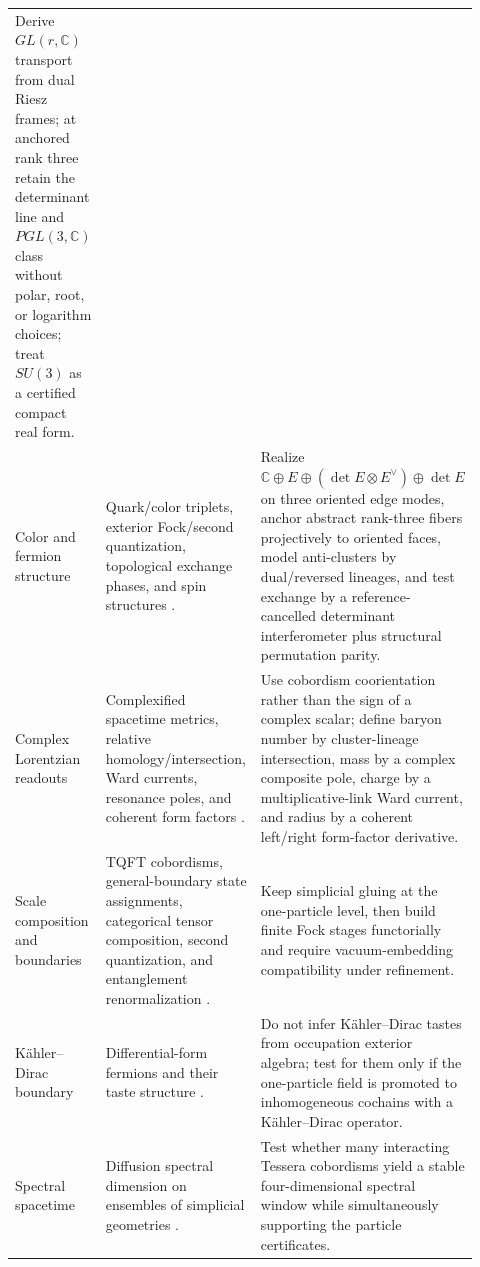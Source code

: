 \documentclass[11pt,letterpaper]{article}
\begin{document}
\begin{longtable}{p{0.2\linewidth}p{0.36\linewidth}p{0.36\linewidth}}
Derive $GL(r,\mathbb C)$ transport from dual Riesz frames; at anchored rank
three retain the determinant line and $PGL(3,\mathbb C)$ class without polar,
root, or logarithm choices; treat $SU(3)$ as a certified compact real form.\\
\addlinespace
Color and fermion structure &
Quark/color triplets, exterior Fock/second quantization, topological exchange
phases, and spin structures
\cite{gellmann1964,hannambu1965,greenberg1964,berezin1966,%
laidlawdewitt1971,leinaasmyrheim1977,lawsonmichelsohn1989,%
cimasonireshetikhin2007}. &
Realize
$\mathbb C\oplus E\oplus(\det E\otimes E^\vee)\oplus\det E$
on three oriented edge modes, anchor abstract rank-three fibers projectively
to oriented faces, model anti-clusters by dual/reversed lineages, and test
exchange by a reference-cancelled determinant interferometer plus structural
permutation parity.\\
\addlinespace
Complex Lorentzian readouts &
Complexified spacetime metrics, relative homology/intersection, Ward currents,
resonance poles, and coherent form factors
\cite{visser2022,bernalsanchez2005,yang2018,gramolinrussell2022}. &
Use cobordism coorientation rather than the sign of a complex scalar; define
baryon number by cluster-lineage intersection, mass by a complex composite
pole, charge by a multiplicative-link Ward current, and radius by a coherent
left/right form-factor derivative.\\
\addlinespace
Scale composition and boundaries &
TQFT cobordisms, general-boundary state assignments, categorical tensor
composition, second quantization, and entanglement renormalization
\cite{atiyah1988,oeckl2003,abramskycoecke2004,berezin1966,vidal2007}. &
Keep simplicial gluing at the one-particle level, then build finite Fock stages
functorially and require vacuum-embedding compatibility under refinement.\\
\addlinespace
K\"ahler--Dirac boundary &
Differential-form fermions and their taste structure
\cite{becherjoos1982,buttcatterall2021}. &
Do not infer K\"ahler--Dirac tastes from occupation exterior algebra; test for
them only if the one-particle field is promoted to inhomogeneous cochains with
a K\"ahler--Dirac operator.\\
\addlinespace
Spectral spacetime &
Diffusion spectral dimension on ensembles of simplicial geometries
\cite{ajl2005}. &
Test whether many interacting Tessera cobordisms yield a stable
four-dimensional spectral window while simultaneously supporting the particle
certificates.\\
\end{longtable}
\endgroup
\end{document}
